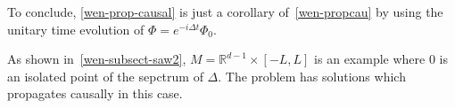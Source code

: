 %
To conclude, 
\cref{wen-prop-causal} is just a corollary of~\cref{wen-propcau} by using the unitary time evolution of $\Phi = e^{-i\Delta t}\Phi_0$.
\begin{remark}
As shown in~\cref{wen-subsect-saw2}, $M = \mathbb{R}^{d-1}\times[-L,L]$ is an example where 0 is an isolated point of the sepctrum of $\Delta$. 
The problem has solutions which propagates causally in this case.
\end{remark}
%
%




